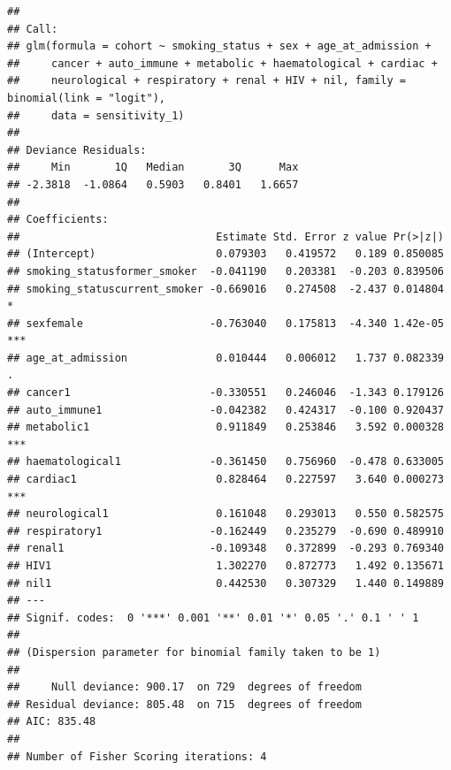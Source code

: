 \documentclass[
]{article}
\newenvironment{Shaded}{\begin{snugshade}}{\end{snugshade}}
\newcommand{\DecValTok}[1]{\textcolor[rgb]{0.00,0.00,0.81}{#1}}
\newcommand{\KeywordTok}[1]{\textcolor[rgb]{0.13,0.29,0.53}{\textbf{#1}}}
\newcommand{\NormalTok}[1]{#1}
\newcommand{\OperatorTok}[1]{\textcolor[rgb]{0.81,0.36,0.00}{\textbf{#1}}}
\begin{document}
\begin{verbatim}
## 
## Call:
## glm(formula = cohort ~ smoking_status + sex + age_at_admission + 
##     cancer + auto_immune + metabolic + haematological + cardiac + 
##     neurological + respiratory + renal + HIV + nil, family = binomial(link = "logit"), 
##     data = sensitivity_1)
## 
## Deviance Residuals: 
##     Min       1Q   Median       3Q      Max  
## -2.3818  -1.0864   0.5903   0.8401   1.6657  
## 
## Coefficients:
##                               Estimate Std. Error z value Pr(>|z|)    
## (Intercept)                   0.079303   0.419572   0.189 0.850085    
## smoking_statusformer_smoker  -0.041190   0.203381  -0.203 0.839506    
## smoking_statuscurrent_smoker -0.669016   0.274508  -2.437 0.014804 *  
## sexfemale                    -0.763040   0.175813  -4.340 1.42e-05 ***
## age_at_admission              0.010444   0.006012   1.737 0.082339 .  
## cancer1                      -0.330551   0.246046  -1.343 0.179126    
## auto_immune1                 -0.042382   0.424317  -0.100 0.920437    
## metabolic1                    0.911849   0.253846   3.592 0.000328 ***
## haematological1              -0.361450   0.756960  -0.478 0.633005    
## cardiac1                      0.828464   0.227597   3.640 0.000273 ***
## neurological1                 0.161048   0.293013   0.550 0.582575    
## respiratory1                 -0.162449   0.235279  -0.690 0.489910    
## renal1                       -0.109348   0.372899  -0.293 0.769340    
## HIV1                          1.302270   0.872773   1.492 0.135671    
## nil1                          0.442530   0.307329   1.440 0.149889    
## ---
## Signif. codes:  0 '***' 0.001 '**' 0.01 '*' 0.05 '.' 0.1 ' ' 1
## 
## (Dispersion parameter for binomial family taken to be 1)
## 
##     Null deviance: 900.17  on 729  degrees of freedom
## Residual deviance: 805.48  on 715  degrees of freedom
## AIC: 835.48
## 
## Number of Fisher Scoring iterations: 4
\end{verbatim}

\begin{Shaded}
\end{Shaded}
\end{document}
